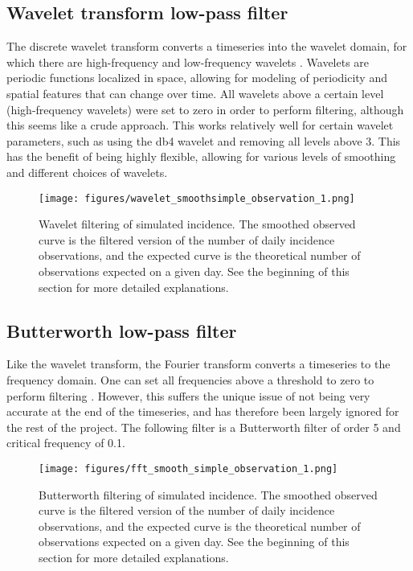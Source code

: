 \documentclass{article}
\begin{document}
\subsection{Wavelet transform low-pass filter}
The discrete wavelet transform converts a timeseries into the wavelet domain, for which there are high-frequency and low-frequency wavelets . Wavelets are periodic functions localized in space, allowing for modeling of periodicity and spatial features that can change over time. \cite{wavelets} All wavelets above a certain level (high-frequency wavelets) were set to zero in order to perform filtering, although this seems like a crude approach. This works relatively well for certain wavelet parameters, such as using the db4 wavelet and removing all levels above 3. This has the benefit of being highly flexible, allowing for various levels of smoothing and different choices of wavelets. 

\clearpage
\begin{figure}[h!]
    \centering
    \texttt{[image: figures/wavelet\_smoothsimple\_observation\_1.png]}
    \caption{Wavelet filtering of simulated incidence. The smoothed observed curve is the filtered version of the number of daily incidence observations, and the expected curve is the theoretical number of observations expected on a given day. See the beginning of this section for more detailed explanations.}
\end{figure}


\subsection{Butterworth low-pass filter}
Like the wavelet transform, the Fourier transform converts a timeseries to the frequency domain. One can set all frequencies above a threshold to zero to perform filtering \cite{butterworth}. However, this suffers the unique issue of not being very accurate at the end of the timeseries, and has therefore been largely ignored for the rest of the project. The following filter is a Butterworth filter of order 5 and critical frequency of 0.1.

\clearpage
\begin{figure}[h!]
    \centering
    \texttt{[image: figures/fft\_smooth\_simple\_observation\_1.png]}
    \caption{Butterworth filtering of simulated incidence. The smoothed observed curve is the filtered version of the number of daily incidence observations, and the expected curve is the theoretical number of observations expected on a given day. See the beginning of this section for more detailed explanations.}
\end{figure}
\end{document}
